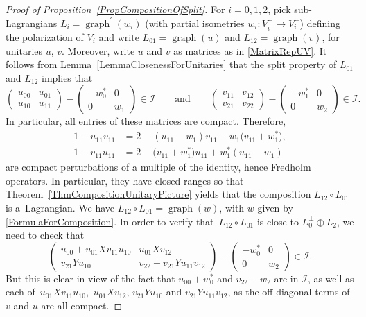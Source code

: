 \documentclass[pdftex]{sigma}
\numberwithin{equation}{section}
\DeclareMathOperator{\graph}{\mathrm{graph}}
\begin{document}
\begin{proof}[Proof of Proposition~\ref{PropCompositionOfSplit}]
For $i = 0, 1, 2$, pick sub-Lagrangians $L_i = \graph^\prime(w_i)$ (with partial isometries $w_i\colon V_i^+ \to V_i^-$) defining the polarization of $V_i$ and write
$L_{01} = \graph(u)$ and ${L_{12} = \graph(v)}$, for unitaries $u$, $v$.
Moreover, write $u$ and $v$ as matrices as in \eqref{MatrixRepUV}.
It follows from Lemma~\ref{LemmaClosenessForUnitaries} that the split property of $L_{01}$ and $L_{12}$ implies that
\begin{equation} \label{ConditionTwo}
\begin{pmatrix} u_{00} & u_{01} \\ u_{10} & u_{11} \end{pmatrix} - \begin{pmatrix} -w_0^* & 0 \\ 0 & w_1 \end{pmatrix} \in \mathcal{I} \qquad \text{and}\qquad
\begin{pmatrix} v_{11} & v_{12} \\ v_{21} & v_{22} \end{pmatrix} - \begin{pmatrix} -w_1^* & 0 \\ 0 & w_2 \end{pmatrix} \in \mathcal{I}.
\end{equation}
In particular, all entries of these matrices are compact.
Therefore,
\begin{align*}
 1 - u_{11} v_{11} &= 2 - (u_{11} - w_1)v_{11} - w_1\bigl(v_{11} +w_1^*\bigr),\\
 1 - v_{11} u_{11} &= 2 - \bigl(v_{11} + w_1^*\bigr) u_{11} + w_1^*(u_{11} - w_1)
\end{align*}
are compact perturbations of a multiple of the identity, hence Fredholm operators.
In particular, they have closed ranges so that Theorem~\ref{ThmCompositionUnitaryPicture} yields that the composition $L_{12} \circ L_{01}$ is a~Lagrangian.
We have $L_{12} \circ L_{01} = \graph(w)$, with $w$ given by \eqref{FormulaForComposition}.
In order to verify that~${L_{12} \circ L_{01}}$ is close to $L_0^\perp \oplus L_2$, we need to check that
\begin{equation*}
\begin{pmatrix} u_{00} + u_{01}X v_{11} u_{10} & u_{01} X v_{12} \\
 v_{21}Y u_{10} & v_{22} + v_{21}Y u_{11}v_{12} \end{pmatrix}
 - \begin{pmatrix} -w_0^* & 0 \\ 0 & w_2 \end{pmatrix} \in \mathcal{I}.
\end{equation*}
But this is clear in view of the fact that $u_{00} + w_0^*$ and $v_{22} - w_2$ are in $\mathcal{I}$, as well as each of~$u_{01}X v_{11} u_{10}$,~$u_{01} X v_{12}$, $v_{21}Y u_{10}$ and $v_{21}Y u_{11}v_{12}$, as the off-diagonal terms of $v$ and $u$ are all compact.
\end{proof}
\end{document}
